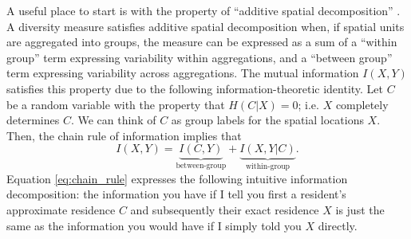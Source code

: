 \documentclass[english]{scrartcl}
\begin{document}
	A useful place to start is with the property of ``additive spatial decomposition'' \cite{Reardon2004}. A diversity measure satisfies additive spatial decomposition when, if spatial units are aggregated into groups, the measure can be expressed as a sum of a ``within group'' term expressing variability within aggregations, and a ``between group'' term expressing variability across aggregations. The mutual information $I(X,Y)$ satisfies this property due to the following information-theoretic identity. Let $C$ be a random variable with the property that $H(C|X) = 0$; i.e. $X$ completely determines $C$. We can think of $C$ as group labels for the spatial locations $X$. Then, the chain rule of information implies that 
	\begin{equation}
		I(X,Y) = \underbrace{I(C,Y)}_{\text{between-group}} + \underbrace{I(X,Y|C)}_{\text{within-group}}. \label{eq:chain_rule}
	\end{equation}
	Equation \eqref{eq:chain_rule} expresses the following intuitive information decomposition: the information you have if I tell you first a resident's approximate residence $C$ and subsequently their exact residence $X$ is just the same as the information you would have if I simply told you $X$ directly. 
\end{document}
